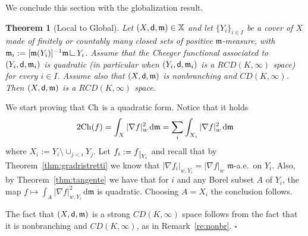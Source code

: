 \documentclass[reqno,11pt]{article}
\numberwithin{equation}{section}
\newcommand{\C}{\mathbb{C}}
\newcommand{\mm}{{\mbox{\boldmath$m$}}}
\newcommand{\sfd}{{\sf d}}
\renewcommand{\d}{{\mathrm d}}
\newcommand{\restr}[1]{\lower3pt\hbox{$|_{#1}$}}
\newenvironment{proof}{\removelastskip\par\medskip   %
\noindent{\em Proof.}
\rm}{\penalty-20\null\hfill$\square$\par\medbreak}
\newtheorem{theorem}{Theorem}[section]
\newcommand{\X}{\mathbb X}
\newcommand{\weakgrad}[1]{|\nabla #1|_w}                %
\newcommand{\res}{\mathop{\hbox{\vrule height 7pt width .5pt depth 0pt
\vrule height .5pt width 6pt depth 0pt}}\nolimits} %
\renewcommand{\C}{{\rm Ch}}
\newcommand{\rcd}[2]{RCD(#1,#2)}
\newcommand{\weakgrado}[2]{|\nabla #1|_{w,#2}}                %
\renewcommand{\mm}{\mathfrak m}
\begin{document}
We conclude this section with the globalization result.
\begin{theorem}[Local to Global]
Let $(X,\sfd,\mm)\in\X$ and let $\{Y_i\}_{i\in I}$ be a cover of $X$
made of finitely or countably many closed sets of positive
$\mm$-measure, with $\mm_i:=[\mm(Y_i)]^{-1}\mm\res{Y_i}$. Assume
that the Cheeger functional associated to $(Y_i,\sfd,\mm_i)$ is
quadratic (in particular when $(Y_i,\sfd,\mm_i)$ is a $\rcd K\infty$
space) for every $i\in I$. Assume also that $(X,\sfd,\mm)$ is
nonbranching and $CD(K,\infty)$. Then $(X,\sfd,\mm)$ is a $\rcd
K\infty$ space.
\end{theorem}
\begin{proof}
We start proving that $\C$ is a quadratic form. Notice that it holds
\[
2\C(f)=\int_X\weakgrad f^2\,\d\mm=\sum_i \int_{X_i}\weakgrad
f^2\,\d\mm
\]
where $X_i:=Y_i\setminus\cup_{j<i}Y_j$. Let $f_i:=f\restr{Y_i}$ and
recall that by Theorem~\ref{thm:gradristretti} we know that
$\weakgrado{f_i}{Y_i}=\weakgrad f$ $\mm$-a.e.~on $Y_i$. Also, by
Theorem~\ref{thm:tangente} we have that for $i$ and any Borel subset
$A$ of $Y_i$, the map $f\mapsto\int_A\weakgrado f{Y_i}^2\,\d\mm$ is
quadratic. Choosing $A=X_i$ the conclusion follows.

The fact that $(X,\sfd,\mm)$ is a strong $CD(K,\infty)$ space
follows from the fact that it is nonbranching and $CD(K,\infty)$, as
in Remark~\ref{re:nonbr}.
\end{proof}
\end{document}
